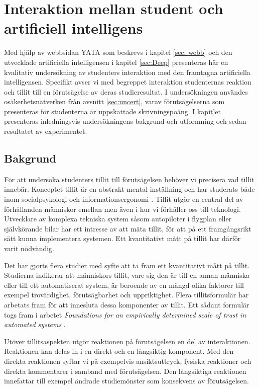 \chapter{Interaktion mellan student och artificiell intelligens}
\label{sec: inter}

Med hjälp av webbsidan YATA som beskrevs i kapitel \ref{sec: webb} och den utvecklade artificiella intelligensen i kapitel \ref{sec:Deep} presenteras här en kvalitativ undersökning av studenters interaktion med den framtagna artificiella intelligensen. Specifikt avser vi med begreppet interaktion studenternas reaktion och tillit till en förutsägelse av deras studieresultat. I undersökningen användes osäkerhetsnätverken från avsnitt \ref{sec:uncert}, varav förutsägelserna som presenteras för studenterna är uppskattade skrivningspoäng. I kapitlet presenteras inledningsvis undersökningens bakgrund och utformning och sedan resultatet av experimentet.

\section{Bakgrund}

För att undersöka studenters tillit till förutsägelsen behöver vi precisera vad tillit innebär. Konceptet tillit är en abstrakt mental inställning och har studerats både inom socialpsykologi och informationsergonomi \cite{ergonomi}. Tillit utgör en central del av förhållanden människor emellan men även i hur vi förhåller oss till teknologi. Utvecklare av komplexa tekniska system såsom autopiloter i flygplan eller självkörande bilar har ett intresse av att mäta tillit, för att på ett framgångsrikt sätt kunna implementera systemen. Ett kvantitativt mått på tillit har därför varit nödvändig.

Det har gjorts flera studier med syfte att ta fram ett kvantitativt mått på tillit. Studierna indikerar att människors tillit, vare sig den är till en annan människa eller till ett automatiserat system, är beroende av en mängd olika faktorer till exempel trovärdighet, förutsägbarhet och uppriktighet. Flera tillitsformulär har arbetats fram för att innesluta dessa komponenter av tillit. Ett sådant formulär togs fram i arbetet \emph{Foundations for an empirically determined scale of trust in automated systems} \cite{trust}. 

Utöver tillitsaspekten utgör reaktionen på förutsägelsen en del av interaktionen. Reaktionen kan delas in i en direkt och en långsiktig komponent. Med den direkta reaktionen syftar vi på exempelvis ansiktsuttryck, fysiska reaktioner och direkta kommentarer i samband med förutsägelsen. Den långsiktiga reaktionen innefattar till exempel ändrade studiemönster som konsekvens av förutsägelsen. 

